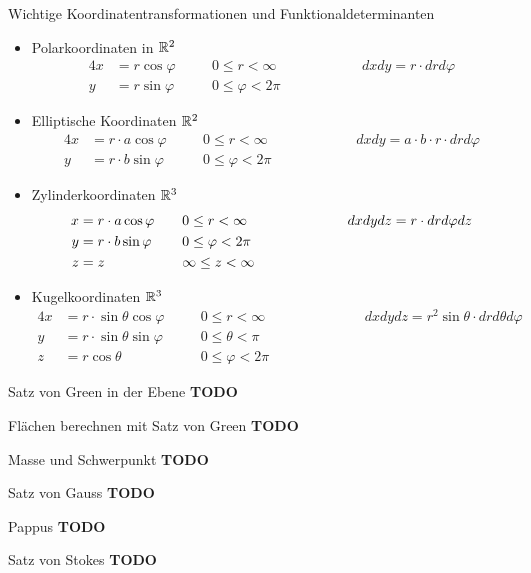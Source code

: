 \begin{Rechenregeln}{Wichtige Koordinatentransformationen und Funktionaldeterminanten}{}
    \begin{itemize}
       \item Polarkoordinaten in $\mathbb{R}^2$ \begin{alignat*}{4}
            x &= r \cos \varphi\quad &&0 \leq r < \infty\quad &~~~~~~~~~~~&&dxdy = r \cdot drd\varphi\\
            y &= r \sin \varphi\quad &&0 \leq \varphi < 2\pi\quad
        \end{alignat*}
        \item Elliptische Koordinaten $\mathbb{R}^2$ \begin{alignat*}{4}
            x &= r \cdot  a \cos \varphi\quad &&0 \leq r < \infty\quad &~~~~~~~~~~~~&&dxdy = a \cdot b \cdot  r \cdot drd\varphi\\
            y &= r \cdot b \sin \varphi\quad &&0 \leq \varphi < 2\pi\quad
        \end{alignat*}
        \item Zylinderkoordinaten $\mathbb{R}^3$ \begin{alignat*}{4}
            x &= r \cdot  a \cos \varphi\quad &&0 \leq r < \infty\quad &~~~~~~~~~~~&&dxdydz = r \cdot drd\varphi dz\\
            y &= r \cdot b \sin \varphi\quad &&0 \leq \varphi < 2\pi\quad\\
            z &= z\quad &&\-\infty \leq z < \infty\quad
        \end{alignat*}
        \item Kugelkoordinaten $\mathbb{R}^3$ \begin{alignat*}{4}
            x &= r \cdot \sin \theta \cos \varphi \quad &&0 \leq r < \infty\quad &~~~~~~~~~~~&&dxdydz = r^2 \sin \theta \cdot drd\theta d\varphi\\
            y &= r \cdot \sin \theta \sin \varphi \quad && 0 \leq \theta < \pi\quad\\
            z &= r \cos \theta \quad &&0 \leq \varphi < 2\pi\quad\quad
        \end{alignat*}
   \end{itemize}
\end{Rechenregeln}

\begin{Satz}{Satz von Green in der Ebene}{}
	\textbf{TODO}	
\end{Satz}

\begin{Rezept}{Flächen berechnen mit Satz von Green}{}
	\textbf{TODO}	
\end{Rezept}

\begin{Satz}{Masse und Schwerpunkt}{}
	\textbf{TODO}	
\end{Satz}

\begin{Satz}{Satz von Gauss}{}
	\textbf{TODO}	
\end{Satz}

\begin{Satz}{Pappus}{}
	\textbf{TODO}	
\end{Satz}

\begin{Satz}{Satz von Stokes}{}
	\textbf{TODO}	
\end{Satz}
